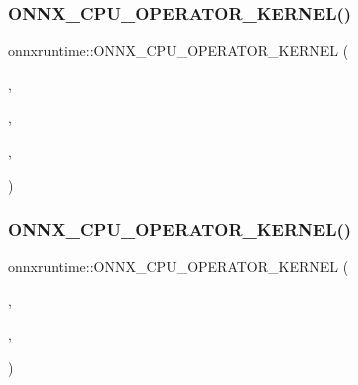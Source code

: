 \subsubsection{\texorpdfstring{O\+N\+N\+X\+\_\+\+C\+P\+U\+\_\+\+O\+P\+E\+R\+A\+T\+O\+R\+\_\+\+K\+E\+R\+N\+E\+L()}{ONNX\_CPU\_OPERATOR\_KERNEL()}\hspace{0.1cm}{\footnotesize\ttfamily [60/71]}}
{\footnotesize\ttfamily onnxruntime\+::\+O\+N\+N\+X\+\_\+\+C\+P\+U\+\_\+\+O\+P\+E\+R\+A\+T\+O\+R\+\_\+\+K\+E\+R\+N\+EL (\begin{DoxyParamCaption}\item[{\mbox{\hyperlink{classonnxruntime_1_1AveragePool}{Average\+Pool}}}]{,  }\item[{7}]{,  }\item[{\mbox{\hyperlink{classonnxruntime_1_1KernelDefBuilder}{Kernel\+Def\+Builder}}().Type\+Constraint(\char`\"{}T\char`\"{}, Data\+Type\+Impl\+::\+Get\+Tensor\+Type$<$ float $>$())}]{,  }\item[{\mbox{\hyperlink{classonnxruntime_1_1Pool}{Pool}}$<$ float, \mbox{\hyperlink{classonnxruntime_1_1AveragePool}{Average\+Pool}} $>$}]{ }\end{DoxyParamCaption})}

\mbox{\label{namespaceonnxruntime_a9b145509d52952763359cc9fdb6f674a}} 
\subsubsection{\texorpdfstring{O\+N\+N\+X\+\_\+\+C\+P\+U\+\_\+\+O\+P\+E\+R\+A\+T\+O\+R\+\_\+\+K\+E\+R\+N\+E\+L()}{ONNX\_CPU\_OPERATOR\_KERNEL()}\hspace{0.1cm}{\footnotesize\ttfamily [61/71]}}
{\footnotesize\ttfamily onnxruntime\+::\+O\+N\+N\+X\+\_\+\+C\+P\+U\+\_\+\+O\+P\+E\+R\+A\+T\+O\+R\+\_\+\+K\+E\+R\+N\+EL (\begin{DoxyParamCaption}\item[{\mbox{\hyperlink{classonnxruntime_1_1MaxPool}{Max\+Pool}}}]{,  }\item[{8}]{,  }\item[{\mbox{\hyperlink{classonnxruntime_1_1KernelDefBuilder}{Kernel\+Def\+Builder}}().Type\+Constraint(\char`\"{}T\char`\"{}, Data\+Type\+Impl\+::\+Get\+Tensor\+Type$<$ float $>$()).Type\+Constraint(\char`\"{}I\char`\"{}, Data\+Type\+Impl\+::\+Get\+Tensor\+Type$<$ int64\+\_\+t $>$())}]{ }\end{DoxyParamCaption})}

